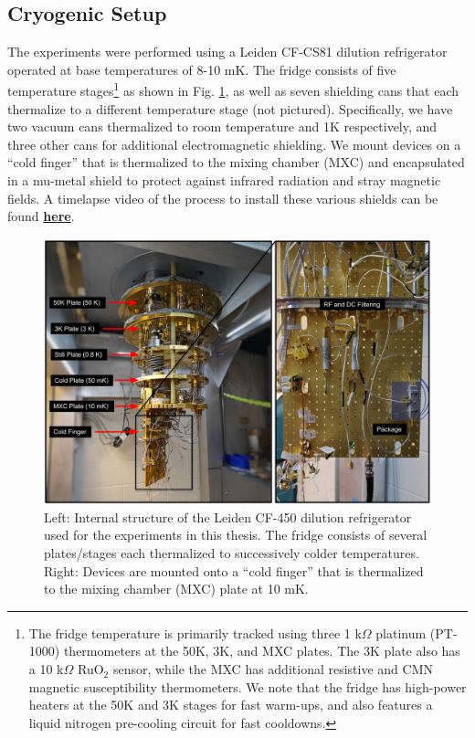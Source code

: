 

\subsection{Cryogenic Setup}

The experiments were performed using a Leiden CF-CS81 dilution refrigerator operated at base temperatures of 8-10 mK. The fridge consists of five temperature stages\footnote{The fridge temperature is primarily tracked using three 1 k$\Omega$ platinum (PT-1000) thermometers at the 50K, 3K, and MXC plates. The 3K plate also has a 10 k$\Omega$ RuO$_2$ sensor, while the MXC has additional resistive and CMN magnetic susceptibility thermometers. We note that the fridge has high-power heaters at the 50K and 3K stages for fast warm-ups, and also features a liquid nitrogen pre-cooling circuit for fast cooldowns.} as shown in Fig. \ref{fig:4-fridge-wiring}, as well as seven shielding cans that each thermalize to a different temperature stage (not pictured). Specifically, we have two vacuum cans thermalized to room temperature and 1K respectively, and three other cans for additional electromagnetic shielding. We mount devices on a ``cold finger'' that is thermalized to the mixing chamber (MXC) and encapsulated in a mu-metal shield to protect against infrared radiation and stray magnetic fields. A timelapse video of the process to install these various shields can be found \href{https://youtu.be/KkvUc9Aw77s?t=829}{\textbf{here}}. 

\begin{figure}[h]
    \centering
    \includegraphics[width=0.9\linewidth]{Figures/4/Fridge-Wiring.pdf}
    \caption{Left: Internal structure of the Leiden CF-450 dilution refrigerator used for the experiments in this thesis. The fridge consists of several plates/stages each thermalized to successively colder temperatures. Right: Devices are mounted onto a ``cold finger'' that is thermalized to the mixing chamber (MXC) plate at 10 mK.}
    \label{fig:4-fridge-wiring}
\end{figure}
\clearpage

